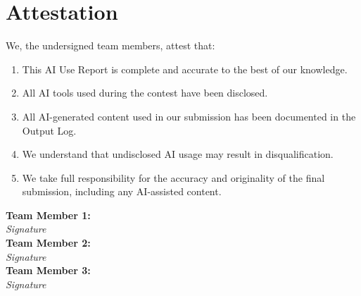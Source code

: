 \documentclass[12pt, a4paper]{article}
\begin{document}
\section{Attestation}

We, the undersigned team members, attest that:

\begin{enumerate}
    \item This AI Use Report is complete and accurate to the best of
    our knowledge.
    \item All AI tools used during the contest have been disclosed.
    \item All AI-generated content used in our submission has been
    documented in the Output Log.
    \item We understand that undisclosed AI usage may result in
    disqualification.
    \item We take full responsibility for the accuracy and originality
    of the final submission, including any AI-assisted content.
\end{enumerate}

\vspace{1cm}

\noindent
\textbf{Team Member 1:} \hrulefill \\
\textit{Signature} \\[1cm]

\noindent
\textbf{Team Member 2:} \hrulefill \\
\textit{Signature} \\[1cm]

\noindent
\textbf{Team Member 3:} \hrulefill \\
\textit{Signature} \\[1cm]
\end{document}
